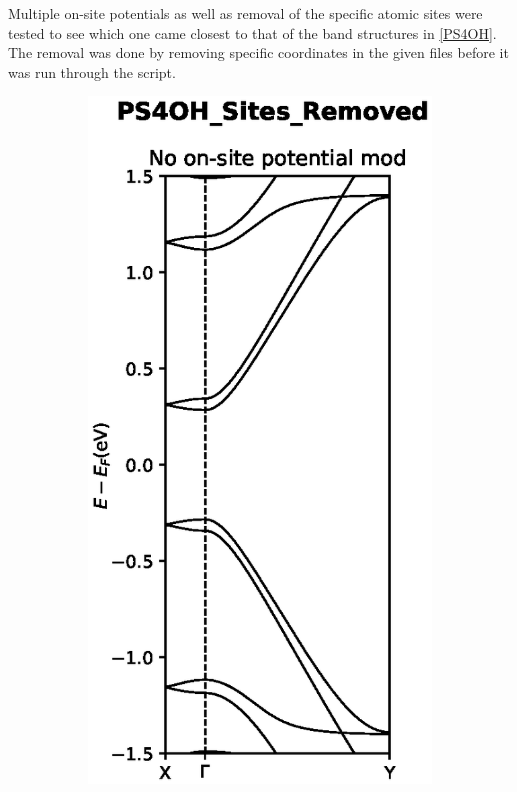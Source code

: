 Multiple on-site potentials as well as removal of the specific atomic sites were tested to see which one came closest to that of the band structures in \cref{PS4OH}. The removal was done by removing specific coordinates in the given files before it was run through the script. 
\begin{figure}[h]
    \centering
    \begin{subfigure}[b]{0.23\textwidth}
    \centering
    \includegraphics[width=\textwidth]{Figures/PS4OHSitesRemoved.eps}

\end{subfigure}
\end{figure}
